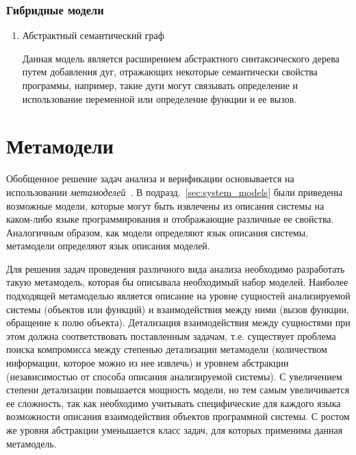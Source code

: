 \subsubsection{Гибридные модели}
\begin{enumerate}
    \item Абстрактный семантический граф

    Данная модель является расширением абстрактного синтаксического дерева путем
    добавления дуг, отражающих некоторые семантически свойства программы,
    например, такие дуги могут связывать определение и использование переменной
    или определение функции и ее вызов.
\end{enumerate}

\section{Метамодели}
\label{sec:metamodels}

Обобщенное решение задач анализа и верификации основывается на использовании
\emph{метамоделей}~\cite{metamodeling}. В подразд.~\ref{sec:system_models}
были приведены возможные модели, которые могут быть извлечены из описания
системы на каком-либо языке программирования и отображающие различные ее
свойства. Аналогичным образом, как модели определяют язык описания системы,
метамодели определяют язык описания моделей.

Для решения задач проведения различного вида анализа необходимо разработать
такую метамодель, которая бы описывала необходимый набор моделей. Наиболее
подходящей метамоделью является описание на уровне сущностей анализируемой
системы (объектов или функций) и взаимодействия между ними (вызов функции,
обращение к полю объекта). Детализация взаимодействия между сущностями при этом
должна соответствовать поставленным задачам, т.е. существует проблема поиска
компромисса между степенью детализации метамодели (количеством информации,
которое можно из нее извлечь) и уровнем абстракции (независимостью от способа
описания анализируемой системы). С увеличением степени детализации повышается
мощность модели, но тем самым увеличивается ее сложность, так как необходимо
учитывать специфические для каждого языка возможности описания взаимодействия
объектов программной системы. С ростом же уровня абстракции уменьшается класс
задач, для которых применима данная метамодель.

